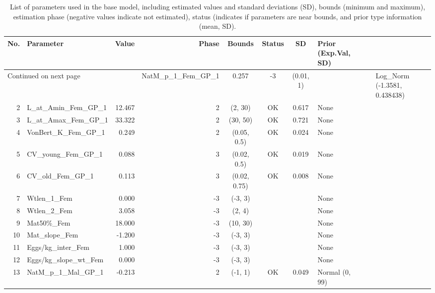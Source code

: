 \documentclass[12pt,]{article}
\begin{document}
\FloatBarrier

\FloatBarrier

\FloatBarrier

\begin{landscape}
\begin{longtable}{rlrrcccl}
\caption{List of parameters used in
                                              the base model, including estimated 
                                              values and standard deviations (SD), 
                                              bounds (minimum and maximum), 
                                              estimation phase (negative values indicate
                                              not estimated), status (indicates if 
                                              parameters are near bounds, and prior type
                                              information (mean, SD).} \\ 
  \hline
No. & Parameter & Value & Phase & Bounds & Status & SD & Prior (Exp.Val, SD)  \\ 
  \hline 
\endhead 
\hline 
\multicolumn{3}{l}{\footnotesize Continued on next page} 
\endfoot 
\endlastfoot 
 \hline
1 & NatM\_p\_1\_Fem\_GP\_1 & 0.257 & -3 & (0.01, 1) &  &  & Log\_Norm (-1.3581, 0.438438) \\ 
  2 & L\_at\_Amin\_Fem\_GP\_1 & 12.467 & 2 & (2, 30) & OK & 0.617 & None \\ 
  3 & L\_at\_Amax\_Fem\_GP\_1 & 33.322 & 2 & (30, 50) & OK & 0.721 & None \\ 
  4 & VonBert\_K\_Fem\_GP\_1 & 0.249 & 2 & (0.05, 0.5) & OK & 0.024 & None \\ 
  5 & CV\_young\_Fem\_GP\_1 & 0.088 & 3 & (0.02, 0.5) & OK & 0.019 & None \\ 
  6 & CV\_old\_Fem\_GP\_1 & 0.113 & 3 & (0.02, 0.75) & OK & 0.008 & None \\ 
  7 & Wtlen\_1\_Fem & 0.000 & -3 & (-3, 3) &  &  & None \\ 
  8 & Wtlen\_2\_Fem & 3.058 & -3 & (2, 4) &  &  & None \\ 
  9 & Mat50\%\_Fem & 18.000 & -3 & (10, 30) &  &  & None \\ 
  10 & Mat\_slope\_Fem & -1.200 & -3 & (-3, 3) &  &  & None \\ 
  11 & Eggs/kg\_inter\_Fem & 1.000 & -3 & (-3, 3) &  &  & None \\ 
  12 & Eggs/kg\_slope\_wt\_Fem & 0.000 & -3 & (-3, 3) &  &  & None \\ 
  13 & NatM\_p\_1\_Mal\_GP\_1 & -0.213 & 2 & (-1, 1) & OK & 0.049 & Normal (0, 99) \\ 

\end{longtable}
\end{landscape}
\end{document}
